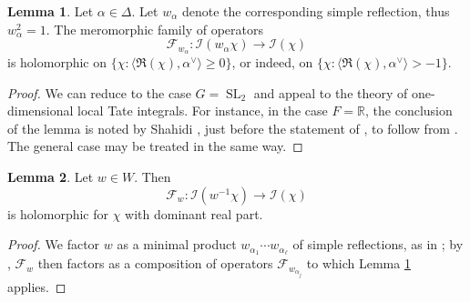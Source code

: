 \documentclass[reqno]{amsart}
\DeclareMathOperator{\SL}{SL}
\theoremstyle{plain} \newtheorem{theorem} {Theorem}
\theoremstyle{definition} \newtheorem{definition} [theorem] {Definition}
\theoremstyle{itplain} %
\newtheorem{lemma}[theorem]{Lemma}
\numberwithin{equation}{section}
\numberwithin{theorem}{section}
\renewcommand{\geq}{\geqslant}
\begin{document}
\begin{lemma}\label{lem:standard:let-alpha-F-w-alpha-holom}
  Let $\alpha \in \Delta$.  Let $w_\alpha$ denote the corresponding simple reflection, thus $w_\alpha^2 = 1$.  The meromorphic family of operators
  \begin{equation*}
    \mathcal{F}_{w_\alpha} : \mathcal{I}(w_\alpha \chi ) \rightarrow \mathcal{I}(\chi)
  \end{equation*}
  is holomorphic on $\{\chi : \langle \Re(\chi), \alpha^\vee \rangle \geq 0\}$, or indeed, on $\{\chi : \langle \Re(\chi), \alpha^\vee \rangle >  -1\}$. 
\end{lemma}
\begin{proof}
  We can reduce to the case $G = \SL_2$ and appeal to the theory of one-dimensional local Tate integrals.  For instance, in the case $F = \mathbb{R}$, the conclusion of the lemma is noted by Shahidi \cite{MR563369}, just before the statement of \cite[Lemma 2.3.2]{MR563369}, to follow from \cite[Prop 2.2.1]{MR563369}.  The general case may be treated in the same way.
\end{proof}

\begin{lemma}\label{lem:jacquet-integral-uniformity-question:let-w-in}
  Let $w \in W$.  Then
  \begin{equation*}
    \mathcal{F}_w : \mathcal{I}(w^{-1} \chi) \rightarrow \mathcal{I}(\chi)
  \end{equation*}
  is holomorphic for $\chi$ with dominant real part.
\end{lemma}
\begin{proof}
  We factor $w$ as a minimal product $w_{\alpha_1} \dotsb w_{\alpha_{\ell}}$ of simple reflections, as in \cite[Thm 2.1.1]{MR610479}; by \cite[\S3.2]{MR610479}, $\mathcal{F}_w$ then factors as a composition of operators $\mathcal{F}_{w_{\alpha_j}}$ to which Lemma \ref{lem:standard:let-alpha-F-w-alpha-holom} applies.
\end{proof}
\end{document}
